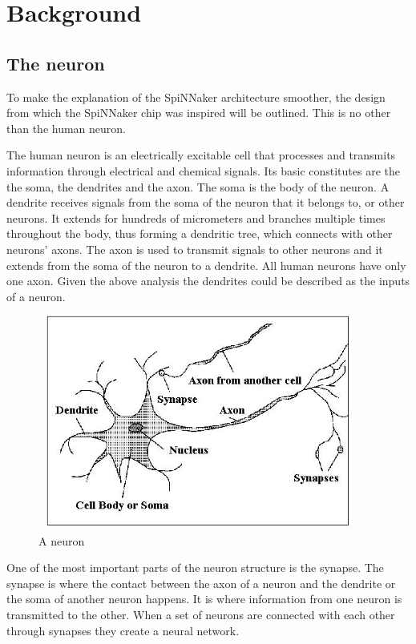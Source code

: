 \documentclass[12pt,twosided]{article}
\begin{document}
\section{Background}
\subsection{The neuron}
To make the explanation of the SpiNNaker architecture smoother, the design from which the SpiNNaker chip was inspired will be outlined. This is no other than the human neuron.

The human neuron is an electrically excitable cell that processes and transmits information through electrical and chemical signals. Its basic constitutes are the the soma, the dendrites and the axon. The soma is the body of the neuron. A dendrite receives signals from the soma of the neuron that it belongs to, or other neurons. It extends for hundreds of micrometers and branches multiple times throughout the body, thus forming a dendritic tree, which connects with other neurons' axons. The axon is used to transmit signals to other neurons and it extends from the soma of the neuron to a dendrite. All human neurons have only one axon. Given the above analysis the dendrites could be described as the inputs of a neuron.
\\[0.5cm]
\begin{figure}[h!]
\includegraphics[width=300pt,height=200pt,scale=2]{Pics/neuron.jpg}
\centering
\caption{A neuron}
\end{figure}

One of the most important parts of the neuron structure is the synapse. The synapse is where the contact between the axon of a neuron and the dendrite or the soma of another neuron happens. It is where information from one neuron is transmitted to the other. When a set of neurons are connected with each other through synapses they create a neural network.
\end{document}
